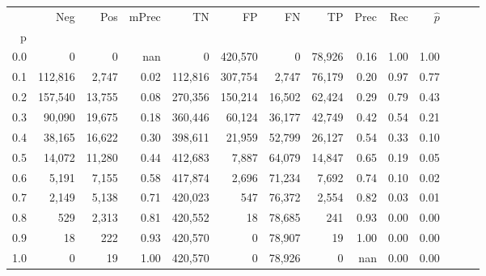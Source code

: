 \begin{tabular}{rrrrrrrrrrrrrr}
\toprule
{} &      Neg &     Pos & mPrec &       TN &       FP &      FN &      TP &  Prec &   Rec & $\hat{p}$ \\
p   &          &         &       &          &          &         &         &       &       &           \\
\midrule
0.0 &        0 &       0 &   nan &        0 &  420,570 &       0 &  78,926 &  0.16 &  1.00 &      1.00 \\
0.1 &  112,816 &   2,747 &  0.02 &  112,816 &  307,754 &   2,747 &  76,179 &  0.20 &  0.97 &      0.77 \\
0.2 &  157,540 &  13,755 &  0.08 &  270,356 &  150,214 &  16,502 &  62,424 &  0.29 &  0.79 &      0.43 \\
0.3 &   90,090 &  19,675 &  0.18 &  360,446 &   60,124 &  36,177 &  42,749 &  0.42 &  0.54 &      0.21 \\
0.4 &   38,165 &  16,622 &  0.30 &  398,611 &   21,959 &  52,799 &  26,127 &  0.54 &  0.33 &      0.10 \\
0.5 &   14,072 &  11,280 &  0.44 &  412,683 &    7,887 &  64,079 &  14,847 &  0.65 &  0.19 &      0.05 \\
0.6 &    5,191 &   7,155 &  0.58 &  417,874 &    2,696 &  71,234 &   7,692 &  0.74 &  0.10 &      0.02 \\
0.7 &    2,149 &   5,138 &  0.71 &  420,023 &      547 &  76,372 &   2,554 &  0.82 &  0.03 &      0.01 \\
0.8 &      529 &   2,313 &  0.81 &  420,552 &       18 &  78,685 &     241 &  0.93 &  0.00 &      0.00 \\
0.9 &       18 &     222 &  0.93 &  420,570 &        0 &  78,907 &      19 &  1.00 &  0.00 &      0.00 \\
1.0 &        0 &      19 &  1.00 &  420,570 &        0 &  78,926 &       0 &   nan &  0.00 &      0.00 \\
\bottomrule
\end{tabular}
